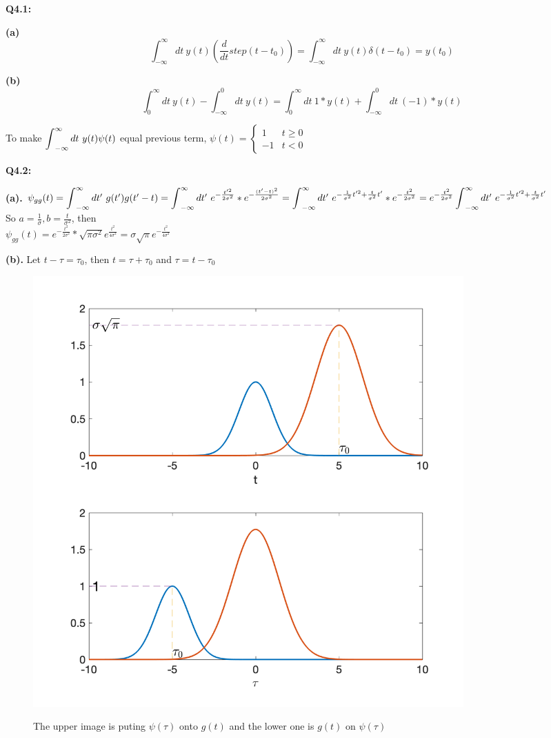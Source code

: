 \documentclass[12pt,a4paper]{article}
\newcommand{\bint}{\mathop{\mathlarger{\int}}}
\begin{document}
    \Large{\textbf{Q4.1:}}

    \textbf{(a)} $$\int_{-\infty}^\infty dt\ y(t)(\frac{d}{dt}step(t-t_0))
    =\int_{-\infty}^\infty dt\ y(t) \delta(t-t_0)
    =y(t_0)$$

    \textbf{(b)} $$\int_0^\infty dt\ y(t)-\int_{-\infty}^{0}dt\ y(t) = \int_0^\infty dt\ 1*y(t) + \int_{-\infty}^{0} dt\ (-1)*y(t)$$
    
    To make $\bint_{-\infty}^\infty dt\ y(t)\psi(t)$ equal previous term, 
    $\psi(t)=
    \begin{cases}
    1  & t \ge 0 \\
    -1 & t < 0
    \end{cases}$

    \newpage
    \Large{\textbf{Q4.2:}}

    \noindent \textbf{(a).}
    $\psi_{gg}(t)=\bint_{-\infty}^\infty dt'\ g(t')g(t'-t)
    =\bint_{-\infty}^\infty dt'\ e^{-\frac{t'^2}{2\sigma^2}} * e^{-\frac{(t'-t)^2}{2\sigma^2}} \\
    =\bint_{-\infty}^\infty dt'\ e^{-\frac{1}{\sigma^2}t'^2+\frac{t}{\sigma^2}t'} * e^{-\frac{t^2}{2\sigma^2}}
    =e^{-\frac{t^2}{2\sigma^2}} \bint_{-\infty}^\infty dt'\ e^{-\frac{1}{\sigma^2}t'^2+\frac{t}{\sigma^2}t'}$\\
    So $a=\frac{1}{\sigma}, b=\frac{t}{\sigma^2}$, then \\
    $\psi_{gg}(t)=e^{-\frac{t^2}{2\sigma^2}}*\sqrt{\pi\sigma^2}e^{\frac{t^2}{4\sigma^2}}=\sigma\sqrt{\pi}e^{-\frac{t^2}{4\sigma^2}}$

    \noindent \textbf{(b).} Let $t-\tau=\tau_0$, then $t=\tau+\tau_0$ and $\tau=t-\tau_0$
    \begin{figure}[!ht]
        \centering
        \includegraphics[width=0.8\textwidth]{g_psi.png}
        \vspace{-0.5cm}
        \label{fig:1}
        \caption{The upper image is puting $\psi(\tau)$ onto $g(t)$ and the lower one is $g(t)$ on $\psi(\tau)$ }
    \end{figure}
\end{document}
